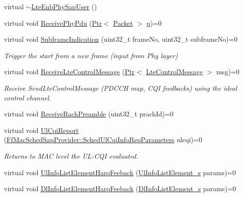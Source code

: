 \begin{DoxyCompactItemize}
\item 
virtual \hyperlink{classns3_1_1LteEnbPhySapUser_a57c5e591a396c7debfe85ea685ad898e}{$\sim$\+Lte\+Enb\+Phy\+Sap\+User} ()
\item 
virtual void \hyperlink{classns3_1_1LteEnbPhySapUser_a109b37803fe3f49b0e9aa1843d90862c}{Receive\+Phy\+Pdu} (\hyperlink{classns3_1_1Ptr}{Ptr}$<$ \hyperlink{classns3_1_1Packet}{Packet} $>$ \hyperlink{lte__link__budget__x2__handover__measures_8m_ac9de518908a968428863f829398a4e62}{p})=0
\item 
virtual void \hyperlink{classns3_1_1LteEnbPhySapUser_ae8ea02073c0d926e3cc37bdc4e5a1cd4}{Subframe\+Indication} (uint32\+\_\+t frame\+No, uint32\+\_\+t subframe\+No)=0
\begin{DoxyCompactList}\small\item\em Trigger the start from a new frame (input from Phy layer) \end{DoxyCompactList}\item 
virtual void \hyperlink{classns3_1_1LteEnbPhySapUser_a8fb3e9a7b3e6820d2c0e5d1b2cb83195}{Receive\+Lte\+Control\+Message} (\hyperlink{classns3_1_1Ptr}{Ptr}$<$ \hyperlink{classns3_1_1LteControlMessage}{Lte\+Control\+Message} $>$ msg)=0
\begin{DoxyCompactList}\small\item\em Receive Send\+Lte\+Control\+Message (P\+D\+C\+CH map, C\+QI feedbacks) using the ideal control channel. \end{DoxyCompactList}\item 
virtual void \hyperlink{classns3_1_1LteEnbPhySapUser_a954e3c5ca07e0bf9f7a7f415a3c19bd5}{Receive\+Rach\+Preamble} (uint32\+\_\+t prach\+Id)=0
\item 
virtual void \hyperlink{classns3_1_1LteEnbPhySapUser_a3641701677a9855e72bce8edca17caf0}{Ul\+Cqi\+Report} (\hyperlink{structns3_1_1FfMacSchedSapProvider_1_1SchedUlCqiInfoReqParameters}{Ff\+Mac\+Sched\+Sap\+Provider\+::\+Sched\+Ul\+Cqi\+Info\+Req\+Parameters} ulcqi)=0
\begin{DoxyCompactList}\small\item\em Returns to M\+AC level the U\+L-\/\+C\+QI evaluated. \end{DoxyCompactList}\item 
virtual void \hyperlink{classns3_1_1LteEnbPhySapUser_a30a613b7e53fa0ac2738f9a15f3aa85f}{Ul\+Info\+List\+Element\+Harq\+Feeback} (\hyperlink{structns3_1_1UlInfoListElement__s}{Ul\+Info\+List\+Element\+\_\+s} params)=0
\item 
virtual void \hyperlink{classns3_1_1LteEnbPhySapUser_a0efd7d35eb7af9c52a040be15af6de35}{Dl\+Info\+List\+Element\+Harq\+Feeback} (\hyperlink{structns3_1_1DlInfoListElement__s}{Dl\+Info\+List\+Element\+\_\+s} params)=0
\end{DoxyCompactItemize}


